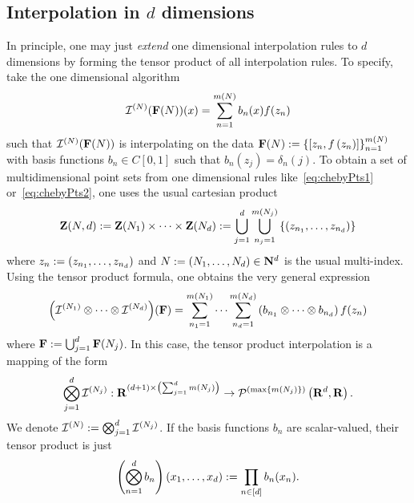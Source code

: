 \documentclass[12pt, oneside]{amsart}
\theoremstyle{definition}
\theoremstyle{remark}
\numberwithin{equation}{section}
\begin{document}
\subsection*{Interpolation in \(d\) dimensions} In principle, one may just \emph{extend} one dimensional interpolation rules to \(d\) dimensions by forming the tensor product of all interpolation rules. To specify, take the one dimensional algorithm
\begin{equation}\label{eq:general1dInterpolation}
    \cI^{(N)}(\FF(N))(x) = \sum_{n = 1}^{m(N)} b_{n}(x) f(z_n)
\end{equation}
such that \(\cI^{(N)}(\FF(N))\) is interpolating on the data \(\FF(N) \defn \set{\left[z_n, f\left(z_n\right)\right]}_{n=1}^{m(N)}\) with basis functions \(b_n \in C[0, 1]\) such that \(b_n(z_j) = \delta_n(j)\). To obtain a set of multidimensional point sets from one dimensional rules like\ \cref{eq:chebyPts1} or\ \cref{eq:chebyPts2}, one uses the usual cartesian product
\begin{equation}\label{eq:cartProduct}
    \ZZ(N, d) \defn \ZZ(N_1) \times \cdots \times \ZZ(N_d) \defn \bigcup_{j=1}^d \bigcup_{n_j=1}^{m(N_j)} \set{\left(z_{n_1}, \dots, z_{n_d}\right)}
\end{equation}
where \(z_n \defn \left(z_{n_1}, \dots, z_{n_d}\right)\) and \(N \defn \left(N_1, \dots, N_d\right) \in \N^d\) is the usual multi-index. Using the tensor product formula, one obtains the very general expression
\begin{equation}\label{eq:tensorProdInterp}
    {\left( \cI^{(N_1)} \otimes \cdots \otimes \cI^{(N_d)} \right)}(\FF)
    = \sum_{n_1 = 1}^{m(N_1)} \cdots \sum_{n_d = 1}^{m(N_d)} \left( b_{n_1} \otimes \cdots \otimes b_{n_d} \right) f(z_{n})
\end{equation}
where \(\FF \defn \bigcup_{j=1}^d \FF(N_j)\). In this case, the tensor product interpolation is a mapping of the form
\begin{equation}\label{eq:tensorProdInterpMappingSpecification}
    \bigotimes_{j=1}^d \cI^{(N_j)}: \R^{(d+1) \times \left(\sum_{j=1}^d m(N_j) \right)} \to \pols[\left(\max \set{m(N_j)} \right)]{\R^d, \R}.
\end{equation}
We denote \(\cI^{(N)} \defn \bigotimes_{j=1}^d \cI^{(N_j)}\). If the basis functions \(b_n\) are scalar-valued, their tensor product is just
\begin{equation}\label{eq:tensorProdFunc}
    \left( \bigotimes_{n=1}^d b_n \right)(x_1, \dots, x_d) \defn \prod_{n \in [d]} b_n(x_n).
\end{equation}
\end{document}
